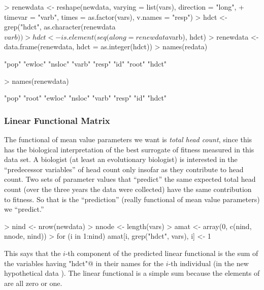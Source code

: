 \documentclass[11pt]{article}
\begin{document}
\begin{Schunk}
\begin{Sinput}
> renewdata <- reshape(newdata, varying = list(vars), direction = "long", 
+     timevar = "varb", times = as.factor(vars), v.names = "resp")
> hdct <- grep("hdct", as.character(renewdata$varb))
> hdct <- is.element(seq(along = renewdata$varb), hdct)
> renewdata <- data.frame(renewdata, hdct = as.integer(hdct))
> names(redata)
\end{Sinput}
\begin{Soutput}
[1] "pop"   "ewloc" "nsloc" "varb"  "resp"  "id"    "root"  "hdct" 
\end{Soutput}
\begin{Sinput}
> names(renewdata)
\end{Sinput}
\begin{Soutput}
[1] "pop"   "root"  "ewloc" "nsloc" "varb"  "resp"  "id"    "hdct" 
\end{Soutput}
\end{Schunk}

\subsubsection{Linear Functional Matrix}

The functional of mean value parameters we want is \emph{total head count},
since this has the biological interpretation of the best surrogate of fitness
measured in this data set.  A biologist (at least an evolutionary biologist)
is interested in the ``predecessor variables'' of head count only insofar
as they contribute to head count.  Two sets of parameter values that
``predict'' the same expected total head count (over the three years the
data were collected) have the same contribution to fitness.  So that is
the ``prediction'' (really functional of mean value parameters) we ``predict.''
\begin{Schunk}
\begin{Sinput}
> nind <- nrow(newdata)
> nnode <- length(vars)
> amat <- array(0, c(nind, nnode, nind))
> for (i in 1:nind) amat[i, grep("hdct", vars), i] <- 1
\end{Sinput}
\end{Schunk}
This says that the $i$-th component of the predicted linear functional
is the sum of the variables having \verb@"hdct"@ in their names for the
$i$-th individual (in the new hypothetical data \verb@newdata@).  The
linear functional is a simple sum because the elements of \verb@amat@
are all zero or one.
\end{document}
